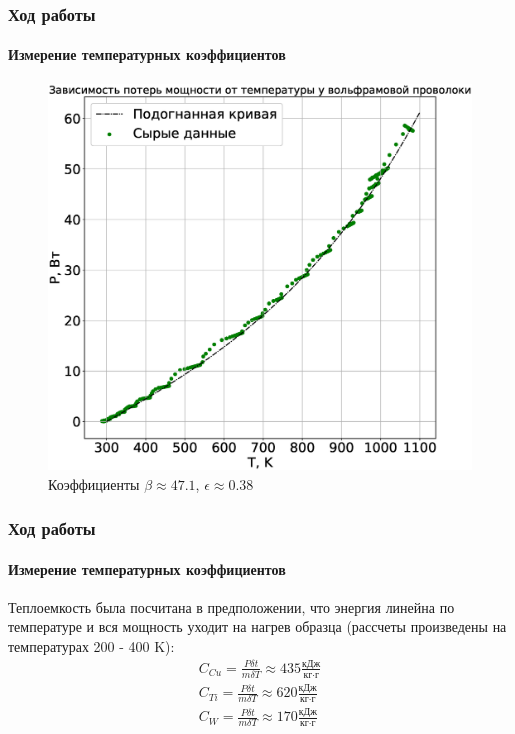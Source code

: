 \documentclass[8pt,pdf,hyperref={unicode}]{beamer}
\begin{document}
\begin{frame}
	\frametitle{Ход работы}
	\framesubtitle{Измерение температурных коэффициентов}
	\begin{center}
			\begin{figure}[h!]
			\centering
			\includegraphics[width=.55\linewidth]{Lab3_8.eps}
			\caption{Коэффициенты $\beta \approx 47.1$, $\epsilon \approx 0.38$}
			\label{fig8}
		\end{figure}		
	\end{center}
\end{frame}
\begin{frame}
	\frametitle{Ход работы}
	\framesubtitle{Измерение температурных коэффициентов}
	\begin{center}
		Теплоемкость была посчитана в предположении, что энергия линейна по температуре и вся мощность уходит на нагрев образца (рассчеты произведены на температурах 200 - 400 K):
		\begin{equation}
			\begin{gathered}
				C_{Cu} = \frac{P \delta t}{m \delta T} \approx 435 \frac{\text{кДж}}{\text{кг} \cdot \text{г}} \\
				C_{Ti} = \frac{P \delta t}{m \delta T} \approx 620 \frac{\text{кДж}}{\text{кг} \cdot \text{г}} \\
				C_{W} = \frac{P \delta t}{m \delta T} \approx 170 \frac{\text{кДж}}{\text{кг} \cdot \text{г}}
			\end{gathered}
		\end{equation}			
	\end{center}
\end{frame}
\end{document}
